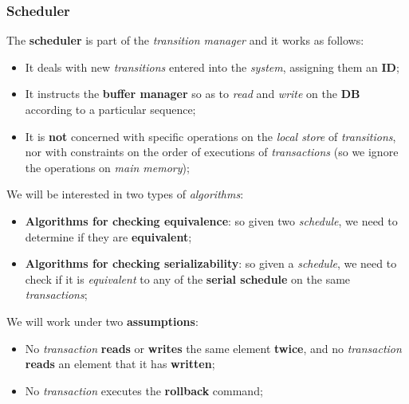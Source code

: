 \documentclass{article}
\begin{document}
\subsubsection{Scheduler}
The \textbf{scheduler} is part of the \emph{transition manager} and it works as follows:
\begin{itemize}
\item It deals with new \emph{transitions} entered into the \emph{system}, assigning them an \textbf{ID};
\item It instructs the \textbf{buffer manager} so as to \emph{read} and \emph{write} on the \textbf{DB} according to a particular sequence;
\item It is \textbf{not} concerned with specific operations on the \emph{local store} of \emph{transitions}, nor with constraints on the order of executions of \emph{transactions} (so we ignore the operations on \emph{main memory});
\end{itemize}
We will be interested in two types of \emph{algorithms}:
\begin{itemize}
\item \textbf{Algorithms for checking equivalence}: so given two \emph{schedule}, we need to determine if they are \textbf{equivalent};
\item \textbf{Algorithms for checking serializability}: so given a \emph{schedule}, we need to check if it is \emph{equivalent} to any of the \textbf{serial schedule} on the same \emph{transactions};
\end{itemize}
We will work under two \textbf{assumptions}: 
\begin{itemize}
\item No \emph{transaction} \textbf{reads} or \textbf{writes} the same element \textbf{twice}, and no \emph{transaction} \textbf{reads} an element that it has \textbf{written};
\item No \emph{transaction} executes the \textbf{rollback} command;
\end{itemize}
\newpage
\end{document}
